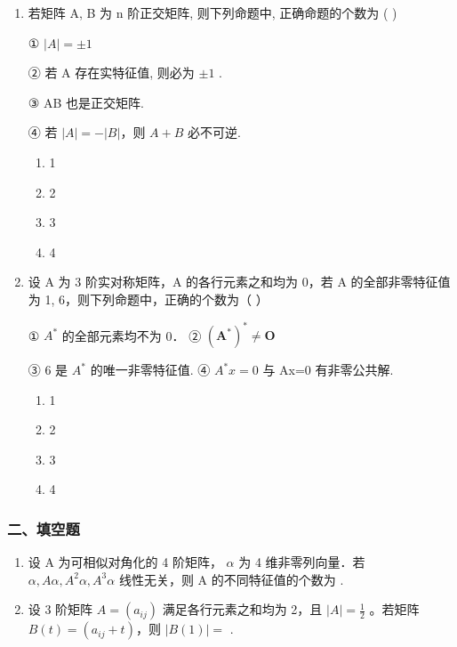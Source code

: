 \documentclass[12pt, a4paper]{ctexart}
\begin{document}
\begin{enumerate}
    \item 若矩阵 A, B 为 n 阶正交矩阵, 则下列命题中, 正确命题的个数为 ( \underline{\hspace{1cm}} )
    
    ① $ \left|A\right|=\pm1 $
    
    ② 若 A 存在实特征值, 则必为 $ \pm1 $ .
    
    ③ AB 也是正交矩阵.
    
    ④ 若 $ \left|A\right|=-\left|B\right| $，则 $ A+B $ 必不可逆.
    \begin{enumerate}[label=(\Alph*)]
        \item 1
        \item 2
        \item 3
        \item 4
    \end{enumerate}

    \item 设 A 为 3 阶实对称矩阵，A 的各行元素之和均为 0，若 A 的全部非零特征值为 1, 6，则下列命题中，正确的个数为（ \underline{\hspace{1cm}} ）
    
    ① $ A^{*} $ 的全部元素均不为 0． ② $ \left(\boldsymbol{A}^{*}\right)^{*}\neq\boldsymbol{O} $
    
    ③ 6 是 $ A^{*} $ 的唯一非零特征值. ④ $ A^{*}x=0 $ 与 Ax=0 有非零公共解.
    \begin{enumerate}[label=(\Alph*)]
        \item 1
        \item 2
        \item 3
        \item 4
    \end{enumerate}
\end{enumerate}

\subsubsection*{二、填空题}

\begin{enumerate}[start=3]
    \item 设 A 为可相似对角化的 4 阶矩阵， $ \alpha $ 为 4 维非零列向量．若 $ \alpha, A\alpha, A^{2}\alpha, A^{3}\alpha $ 线性无关，则 A 的不同特征值的个数为 \underline{\hspace{2cm}}.

    \item 设 3 阶矩阵 $ A = (a_{ij}) $ 满足各行元素之和均为 2，且 $ |A| = \frac{1}{2} $ 。若矩阵 $ B(t) = (a_{ij} + t) $，则 $ |B(1)| = $ \underline{\hspace{2cm}}.
\end{enumerate}
\end{document}
